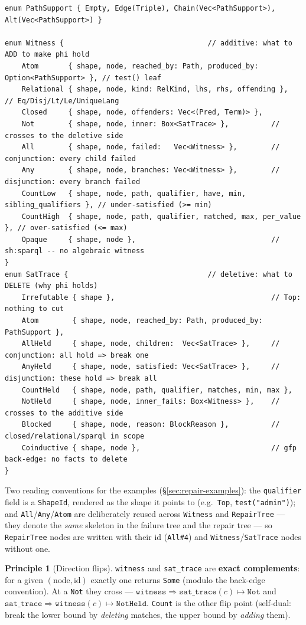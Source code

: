 \documentclass[11pt]{article}
\newcommand{\code}[1]{\texttt{#1}}
\theoremstyle{definition}
\newtheorem{principle}{Principle}[section]
\begin{document}
\begin{lstlisting}
enum PathSupport { Empty, Edge(Triple), Chain(Vec<PathSupport>), Alt(Vec<PathSupport>) }

enum Witness {                                  // additive: what to ADD to make phi hold
    Atom       { shape, node, reached_by: Path, produced_by: Option<PathSupport> }, // test() leaf
    Relational { shape, node, kind: RelKind, lhs, rhs, offending },  // Eq/Disj/Lt/Le/UniqueLang
    Closed     { shape, node, offenders: Vec<(Pred, Term)> },
    Not        { shape, node, inner: Box<SatTrace> },          // crosses to the deletive side
    All        { shape, node, failed:   Vec<Witness> },        // conjunction: every child failed
    Any        { shape, node, branches: Vec<Witness> },        // disjunction: every branch failed
    CountLow   { shape, node, path, qualifier, have, min, sibling_qualifiers }, // under-satisfied (>= min)
    CountHigh  { shape, node, path, qualifier, matched, max, per_value }, // over-satisfied (<= max)
    Opaque     { shape, node },                                // sh:sparql -- no algebraic witness
}
enum SatTrace {                                 // deletive: what to DELETE (why phi holds)
    Irrefutable { shape },                                     // Top: nothing to cut
    Atom        { shape, node, reached_by: Path, produced_by: PathSupport },
    AllHeld     { shape, node, children:  Vec<SatTrace> },     // conjunction: all hold => break one
    AnyHeld     { shape, node, satisfied: Vec<SatTrace> },     // disjunction: these hold => break all
    CountHeld   { shape, node, path, qualifier, matches, min, max },
    NotHeld     { shape, node, inner_fails: Box<Witness> },    // crosses to the additive side
    Blocked     { shape, node, reason: BlockReason },          // closed/relational/sparql in scope
    Coinductive { shape, node },                               // gfp back-edge: no facts to delete
}
\end{lstlisting}
\noindent Two reading conventions for the examples (\S\ref{sec:repair-examples}):
the \code{qualifier} field is a \code{ShapeId}, rendered as the shape it points to
(e.g.\ \code{Top}, \code{test("admin")}); and \code{All}/\code{Any}/\code{Atom}
are deliberately reused across \code{Witness} and \code{RepairTree} --- they denote
the \emph{same} skeleton in the failure tree and the repair tree --- so
\code{RepairTree} nodes are written with their id (\code{All\#4}) and
\code{Witness}/\code{SatTrace} nodes without one.
\begin{principle}[Direction flips]
\code{witness} and \code{sat\_trace} are \textbf{exact complements}: for a given
$(\text{node},\text{id})$ exactly one returns \code{Some} (modulo the back-edge
convention). At a \code{Not} they cross --- $\code{witness}\Rightarrow
\code{sat\_trace}(c)\mapsto\code{Not}$ and
$\code{sat\_trace}\Rightarrow\code{witness}(c)\mapsto\code{NotHeld}$. \code{Count}
is the other flip point (self-dual: break the lower bound by \emph{deleting}
matches, the upper bound by \emph{adding} them).
\end{principle}
\end{document}
